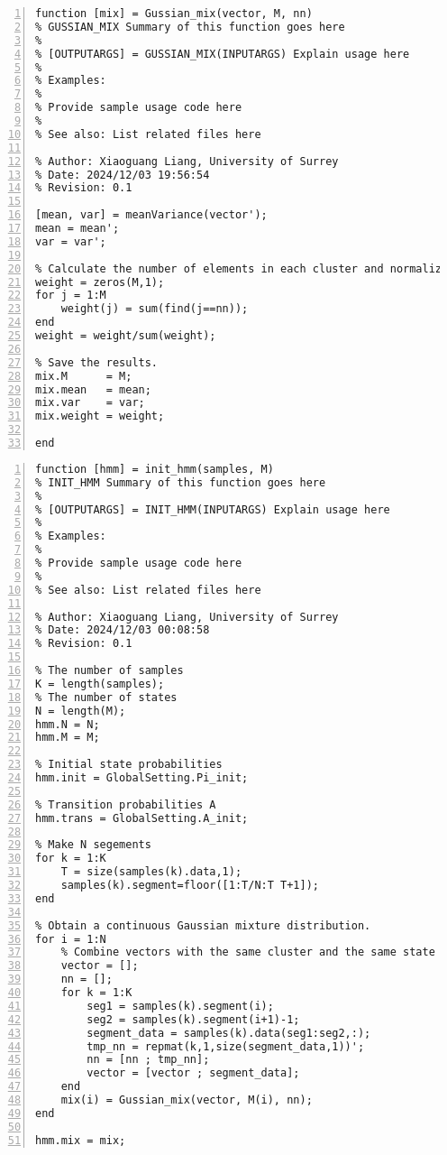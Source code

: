 \documentclass{article}
\begin{document}
\begin{lstlisting}[frame=single, numbers=left, style=Matlab-editor, caption={Gussian\_mix.m}, label={lst:Gussian_mix}]
  function [mix] = Gussian_mix(vector, M, nn)
% GUSSIAN_MIX Summary of this function goes here
%
% [OUTPUTARGS] = GUSSIAN_MIX(INPUTARGS) Explain usage here
%
% Examples:
%
% Provide sample usage code here
%
% See also: List related files here

% Author: Xiaoguang Liang, University of Surrey
% Date: 2024/12/03 19:56:54
% Revision: 0.1

[mean, var] = meanVariance(vector');
mean = mean';
var = var';

% Calculate the number of elements in each cluster and normalize them to obtain the weights for each PDF.
weight = zeros(M,1);
for j = 1:M
    weight(j) = sum(find(j==nn));
end
weight = weight/sum(weight);

% Save the results.
mix.M      = M;
mix.mean   = mean;
mix.var    = var;
mix.weight = weight;

end

\end{lstlisting}

\begin{lstlisting}[frame=single, numbers=left, style=Matlab-editor, caption={init\_hmm.m}, label={lst:init_hmm}]
  function [hmm] = init_hmm(samples, M)
% INIT_HMM Summary of this function goes here
%
% [OUTPUTARGS] = INIT_HMM(INPUTARGS) Explain usage here
%
% Examples:
%
% Provide sample usage code here
%
% See also: List related files here

% Author: Xiaoguang Liang, University of Surrey
% Date: 2024/12/03 00:08:58
% Revision: 0.1

% The number of samples
K = length(samples);
% The number of states
N = length(M);
hmm.N = N;
hmm.M = M;

% Initial state probabilities
hmm.init = GlobalSetting.Pi_init;

% Transition probabilities A
hmm.trans = GlobalSetting.A_init;

% Make N segements
for k = 1:K
    T = size(samples(k).data,1);
    samples(k).segment=floor([1:T/N:T T+1]);
end

% Obtain a continuous Gaussian mixture distribution.
for i = 1:N
    % Combine vectors with the same cluster and the same state into a single vector.
    vector = [];
    nn = [];
    for k = 1:K
        seg1 = samples(k).segment(i);
        seg2 = samples(k).segment(i+1)-1;
        segment_data = samples(k).data(seg1:seg2,:);
        tmp_nn = repmat(k,1,size(segment_data,1))';
        nn = [nn ; tmp_nn];
        vector = [vector ; segment_data];
    end
    mix(i) = Gussian_mix(vector, M(i), nn);
end

hmm.mix = mix;

\end{lstlisting}
\end{document}
